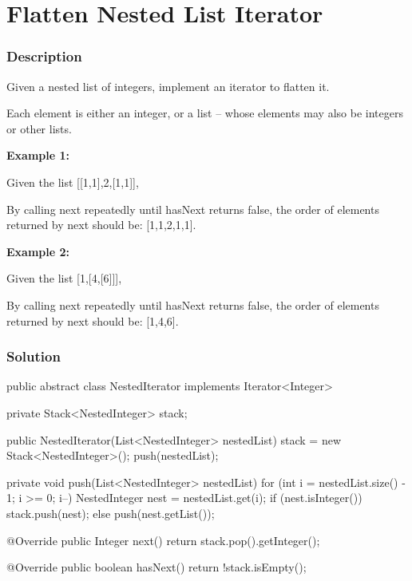 \newpage

\section{Flatten Nested List Iterator} %

\subsubsection{Description}
Given a nested list of integers, implement an iterator to flatten it.

Each element is either an integer, or a list -- whose elements may also be integers or other lists.

\textbf{Example 1:}

Given the list [[1,1],2,[1,1]],

By calling next repeatedly until hasNext returns false, the order of elements returned by next should be: [1,1,2,1,1].

\textbf{Example 2:}

Given the list [1,[4,[6]]],

By calling next repeatedly until hasNext returns false, the order of elements returned by next should be: [1,4,6].

\subsubsection{Solution}

\begin{Code}
public abstract class NestedIterator implements Iterator<Integer> {

    private Stack<NestedInteger> stack;

    public NestedIterator(List<NestedInteger> nestedList) {
        stack = new Stack<NestedInteger>();
        push(nestedList);
    }

    private void push(List<NestedInteger> nestedList) {
        for (int i = nestedList.size() - 1; i >= 0; i--) {
            NestedInteger nest = nestedList.get(i);
            if (nest.isInteger()) {
                stack.push(nest);
            } else {
                push(nest.getList());
            }
        }
    }

    @Override
    public Integer next() {
        return stack.pop().getInteger();
    }

    @Override
    public boolean hasNext() {
        return !stack.isEmpty();
    }
}
\end{Code}

